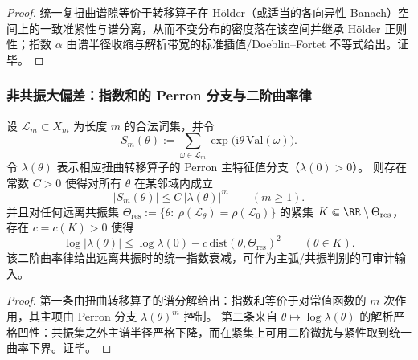 \begin{proof}
统一复扭曲谱隙等价于转移算子在 Hölder（或适当的各向异性 Banach）空间上的一致准紧性与谱分离，从而不变分布的密度落在该空间并继承 Hölder 正则性；指数 \(\alpha\) 由谱半径收缩与解析带宽的标准插值/Doeblin--Fortet 不等式给出。证毕。
\end{proof}

\subsubsection{非共振大偏差：指数和的 Perron 分支与二阶曲率律}

\begin{proposition}\label{prop:conclusion65-expsums-uniform-ldp}
设 \(\mathcal{L}_m\subset X_m\) 为长度 \(m\) 的合法词集，并令
\[
S_m(\theta):=\sum_{\omega\in\mathcal{L}_m}\exp\!\bigl(\mathrm{i}\theta\,\mathrm{Val}(\omega)\bigr).
\]
令 \(\lambda(\theta)\) 表示相应扭曲转移算子的 Perron 主特征值分支（\(\lambda(0)>0\)）。
则存在常数 \(C>0\) 使得对所有 \(\theta\) 在某邻域内成立
\[
\boxed{\;
|S_m(\theta)|\le C\,|\lambda(\theta)|^{m}\qquad(m\ge 1).\;}
\]
并且对任何远离共振集
\(
\Theta_{\mathrm{res}}:=\{\theta:\ \rho(\mathcal{L}_{\theta})=\rho(\mathcal{L}_0)\}
\)
的紧集 \(K\Subset \RR\setminus\Theta_{\mathrm{res}}\)，存在 \(c=c(K)>0\) 使得
\[
\boxed{\;
\log|\lambda(\theta)|
\le \log\lambda(0)-c\,\mathrm{dist}(\theta,\Theta_{\mathrm{res}})^{2}
\qquad(\theta\in K).\;}
\]
该二阶曲率律给出远离共振时的统一指数衰减，可作为主弧/共振判别的可审计输入。
\end{proposition}

\begin{proof}
第一条由扭曲转移算子的谱分解给出：指数和等价于对常值函数的 \(m\) 次作用，其主项由 Perron 分支 \(\lambda(\theta)^{m}\) 控制。
第二条来自 \(\theta\mapsto \log\lambda(\theta)\) 的解析严格凹性：共振集之外主谱半径严格下降，而在紧集上可用二阶微扰与紧性取到统一曲率下界。证毕。
\end{proof}

\endinput
